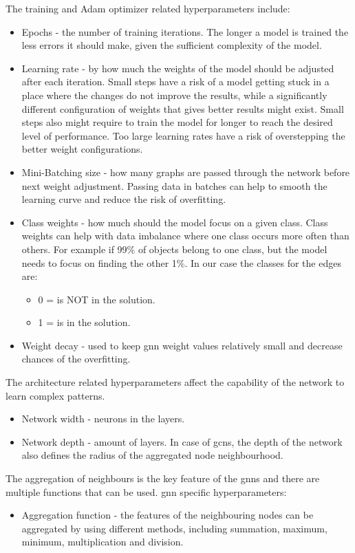 The training and Adam optimizer related hyperparameters include:
\begin{itemize}
\item Epochs - the number of training iterations. The longer a model is trained the less errors it should make, given the sufficient complexity of the model.
\item Learning rate - by how much the weights of the model should be adjusted after each iteration. Small steps have a risk of a model getting stuck in a place where the changes do not improve the results, while a significantly different configuration of weights that gives better results might exist. Small steps also might require to train the model for longer to reach the desired level of performance. Too large learning rates have a risk of overstepping the better weight configurations.
\item Mini-Batching size - how many graphs are passed through the network before next weight adjustment. Passing data in batches can help to smooth the learning curve and reduce the risk of overfitting.
\item Class weights - how much should the model focus on a given class. Class weights can help with data imbalance where one class occurs more often than others. For example if 99\% of objects belong to one class, but the model needs to focus on finding the other 1\%. In our case the classes for the edges are: 
	\begin{itemize}
	\item 0 = is NOT in the solution.
	\item 1 = is in the solution.
	\end{itemize}	
\item Weight decay - used to keep \gls{gnn} weight values relatively small and decrease chances of the overfitting. 
\end{itemize}

The architecture related hyperparameters affect the capability of the network to learn complex patterns. 
\begin{itemize}
\item Network width - neurons in the layers.
\item Network depth - amount of layers. In case of \gls{gcn}s, the depth of the network also defines the radius of the aggregated node neighbourhood. 
\end{itemize}

The aggregation of neighbours is the key feature of the \gls{gnn}s and there are multiple functions that can be used.
\gls{gnn} specific hyperparameters:
\begin{itemize}
\item Aggregation function - the features of the neighbouring nodes can be aggregated by using different methods, including summation, maximum, minimum, multiplication and division.
\end{itemize}

